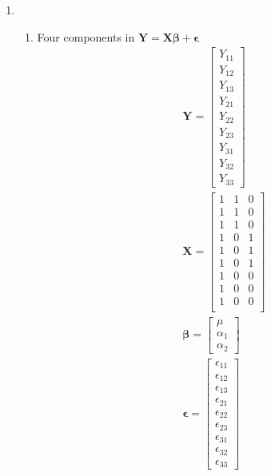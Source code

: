 \documentclass{article}
\begin{document}
\begin{enumerate}[leftmargin = 0 em, label = \arabic*., font = \bfseries]
	\item 
	\begin{enumerate}
		\item Four components in ${\bm Y} = \bm X \bm \beta + \bm \epsilon$
		\begin{align*}
		& \bm Y = \begin{bmatrix}
			Y_{11}\\
			Y_{12}\\
			Y_{13}\\
			Y_{21}\\
			Y_{22}\\
			Y_{23}\\
			Y_{31}\\
			Y_{32}\\
			Y_{33}
		\end{bmatrix}
		\\
		& \bm X = \begin{bmatrix}
			1&1&0\\
			1&1&0\\
			1&1&0\\
			1&0&1\\
			1&0&1\\
			1&0&1\\
			1&0&0\\
			1&0&0\\
			1&0&0\\
		\end{bmatrix}
		\\
		& \bm \beta = \begin{bmatrix}
			\mu\\
			\alpha_1\\
			\alpha_2
		\end{bmatrix}
		\\
		& \bm \epsilon = \begin{bmatrix}
			\epsilon_{11}\\
			\epsilon_{12}\\
			\epsilon_{13}\\
			\epsilon_{21}\\
			\epsilon_{22}\\
			\epsilon_{23}\\
			\epsilon_{31}\\
			\epsilon_{32}\\
			\epsilon_{33}
		\end{bmatrix}
		\end{align*}


\end{enumerate}
\end{enumerate}
\end{document}
